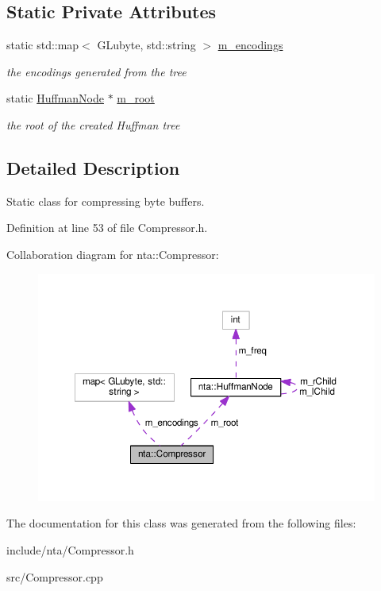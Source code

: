 \subsection*{Static Private Attributes}
\begin{DoxyCompactItemize}
\item 
\mbox{\label{classnta_1_1Compressor_a85e378612ff069d0bc915c87fae74e7d}} 
static std\+::map$<$ G\+Lubyte, std\+::string $>$ \hyperlink{classnta_1_1Compressor_a85e378612ff069d0bc915c87fae74e7d}{m\+\_\+encodings}
\begin{DoxyCompactList}\small\item\em the encodings generated from the tree \end{DoxyCompactList}\item 
\mbox{\label{classnta_1_1Compressor_a9cec9a631892c8cd4b9c2358c7ac41f4}} 
static \hyperlink{classnta_1_1HuffmanNode}{Huffman\+Node} $\ast$ \hyperlink{classnta_1_1Compressor_a9cec9a631892c8cd4b9c2358c7ac41f4}{m\+\_\+root}
\begin{DoxyCompactList}\small\item\em the root of the created Huffman tree \end{DoxyCompactList}\end{DoxyCompactItemize}


\subsection{Detailed Description}
Static class for compressing byte buffers. 

Definition at line 53 of file Compressor.\+h.



Collaboration diagram for nta\+:\+:Compressor\+:
\nopagebreak
\begin{figure}[H]
\begin{center}
\leavevmode
\includegraphics[width=350pt]{d6/deb/classnta_1_1Compressor__coll__graph}
\end{center}
\end{figure}


The documentation for this class was generated from the following files\+:\begin{DoxyCompactItemize}
\item 
include/nta/Compressor.\+h\item 
src/Compressor.\+cpp\end{DoxyCompactItemize}
